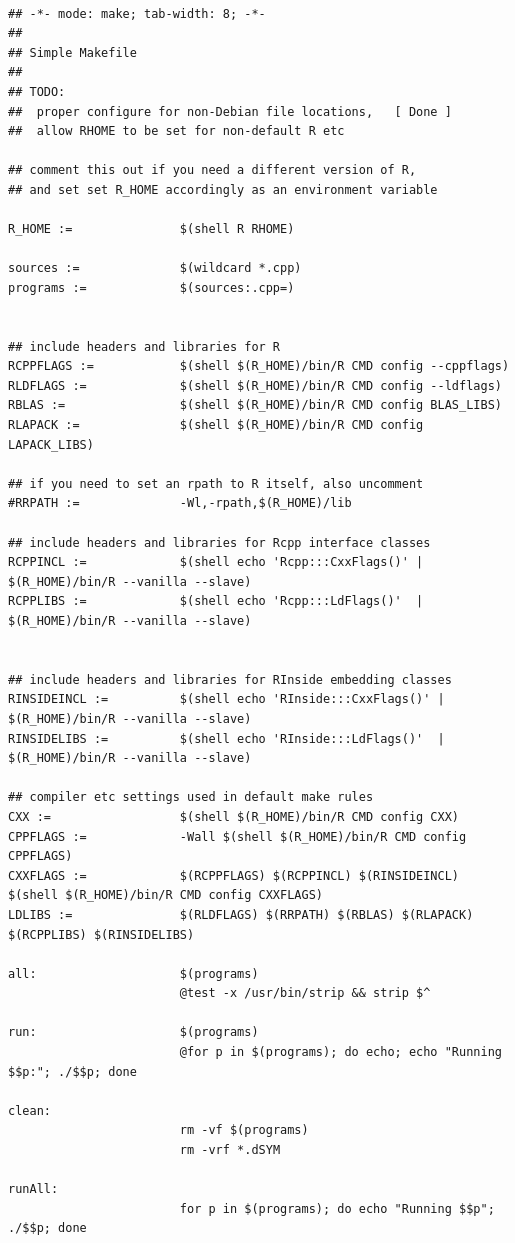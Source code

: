 \documentclass[11pt]{article}
\begin{document}
\begin{verbatim}

## -*- mode: make; tab-width: 8; -*-
##
## Simple Makefile
##
## TODO: 
##  proper configure for non-Debian file locations,   [ Done ]
##  allow RHOME to be set for non-default R etc

## comment this out if you need a different version of R, 
## and set set R_HOME accordingly as an environment variable

R_HOME :=               $(shell R RHOME)

sources :=              $(wildcard *.cpp)
programs :=             $(sources:.cpp=)


## include headers and libraries for R 
RCPPFLAGS :=            $(shell $(R_HOME)/bin/R CMD config --cppflags)
RLDFLAGS :=             $(shell $(R_HOME)/bin/R CMD config --ldflags)
RBLAS :=                $(shell $(R_HOME)/bin/R CMD config BLAS_LIBS)
RLAPACK :=              $(shell $(R_HOME)/bin/R CMD config LAPACK_LIBS)

## if you need to set an rpath to R itself, also uncomment
#RRPATH :=              -Wl,-rpath,$(R_HOME)/lib

## include headers and libraries for Rcpp interface classes
RCPPINCL :=             $(shell echo 'Rcpp:::CxxFlags()' | $(R_HOME)/bin/R --vanilla --slave)
RCPPLIBS :=             $(shell echo 'Rcpp:::LdFlags()'  | $(R_HOME)/bin/R --vanilla --slave)


## include headers and libraries for RInside embedding classes
RINSIDEINCL :=          $(shell echo 'RInside:::CxxFlags()' | $(R_HOME)/bin/R --vanilla --slave)
RINSIDELIBS :=          $(shell echo 'RInside:::LdFlags()'  | $(R_HOME)/bin/R --vanilla --slave)

## compiler etc settings used in default make rules
CXX :=                  $(shell $(R_HOME)/bin/R CMD config CXX)
CPPFLAGS :=             -Wall $(shell $(R_HOME)/bin/R CMD config CPPFLAGS)
CXXFLAGS :=             $(RCPPFLAGS) $(RCPPINCL) $(RINSIDEINCL) $(shell $(R_HOME)/bin/R CMD config CXXFLAGS)
LDLIBS :=               $(RLDFLAGS) $(RRPATH) $(RBLAS) $(RLAPACK) $(RCPPLIBS) $(RINSIDELIBS)

all:                    $(programs)
                        @test -x /usr/bin/strip && strip $^

run:                    $(programs)
                        @for p in $(programs); do echo; echo "Running $$p:"; ./$$p; done

clean:
                        rm -vf $(programs)
                        rm -vrf *.dSYM

runAll:
                        for p in $(programs); do echo "Running $$p"; ./$$p; done
\end{verbatim}
\end{document}
